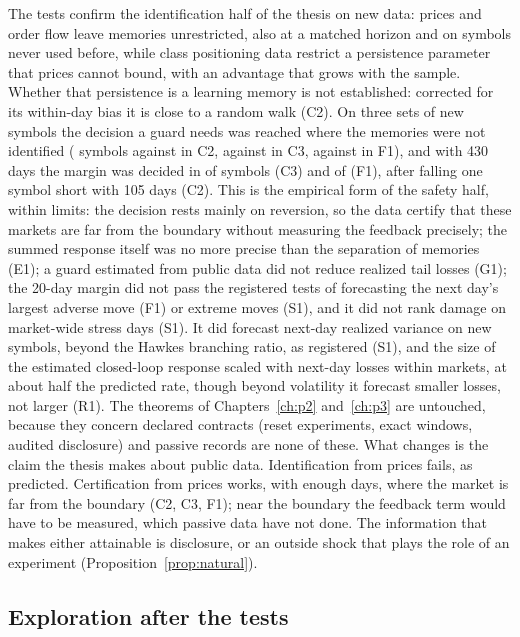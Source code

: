 The tests confirm the identification half of the thesis on new data: prices and order flow leave memories unrestricted, also at a matched horizon and on symbols never used before, while class positioning data restrict a persistence parameter that prices cannot bound, with an advantage that grows with the sample. Whether that persistence is a learning memory is not established: corrected for its within-day bias it is close to a random walk (C2). On three sets of new symbols the decision a guard needs was reached where the memories were not identified (\CtwoB{} symbols against \CtwoC{} in C2, \CthreeB{} against \CthreeC{} in C3, \FoneB{} against \FoneC{} in F1), and with 430 days the margin was decided in \CthreeDecided{} of \CthreeSymbols{} symbols (C3) and \FoneDecided{} of \FoneSymbols{} (F1), after falling one symbol short with 105 days (C2). This is the empirical form of the safety half, within limits: the decision rests mainly on reversion, so the data certify that these markets are far from the boundary without measuring the feedback precisely; the summed response itself was no more precise than the separation of memories (E1); a guard estimated from public data did not reduce realized tail losses (G1); the 20-day margin did not pass the registered tests of forecasting the next day's largest adverse move (F1) or extreme moves (S1), and it did not rank damage on market-wide stress days (S1). It did forecast next-day realized variance on new symbols, beyond the Hawkes branching ratio, as registered (S1), and the size of the estimated closed-loop response scaled with next-day losses within markets, at about half the predicted rate, though beyond volatility it forecast smaller losses, not larger (R1). The theorems of Chapters~\ref{ch:p2} and~\ref{ch:p3} are untouched, because they concern declared contracts (reset experiments, exact windows, audited disclosure) and passive records are none of these. What changes is the claim the thesis makes about public data. Identification from prices fails, as predicted. Certification from prices works, with enough days, where the market is far from the boundary (C2, C3, F1); near the boundary the feedback term would have to be measured, which passive data have not done. The information that makes either attainable is disclosure, or an outside shock that plays the role of an experiment (Proposition~\ref{prop:natural}).

\subsection{Exploration after the tests}\label{sec:ev_explore}


